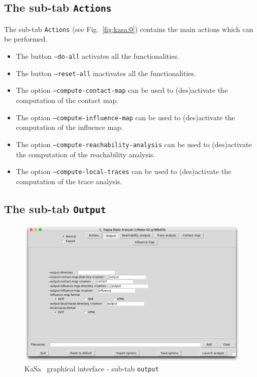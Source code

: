 \documentclass[11pt]{book}
\def\KaSa{\textsf{KaSa}}
\begin{document}
\subsection{The sub-tab \texttt{Actions}}

The sub-tab \texttt{Actions} (see Fig.~\ref{fig:kasa:0}) contains the main actions which can be performed.

\begin{itemize}
\item The button \texttt{--do-all} activates all the functionalities.
\item The button \texttt{--reset-all} inactivates all the functionalities.
\item The option \texttt{--compute-contact-map} can be used to (des)activate the computation of the contact map.
\item The option \texttt{--compute-influence-map} can be used to (des)activate the computation of the influence map.
\item The option \texttt{--compute-reachability-analysis} can be used to (des)activate the computation of the reachability analysis.
\item The option \texttt{--compute-local-traces} can be used to (des)activate the computation of the trace analysis.
\end{itemize}

\subsection{The sub-tab \texttt{Output}}

\begin{figure}[htbp]
\centering
\includegraphics[width=12cm,bb=0 0 1904 1208]{img/kasa_1.png}
\caption{\KaSa~ graphical interface - sub-tab \texttt{output}}
\label{fig:kasa:1}
\end{figure}
\end{document}
